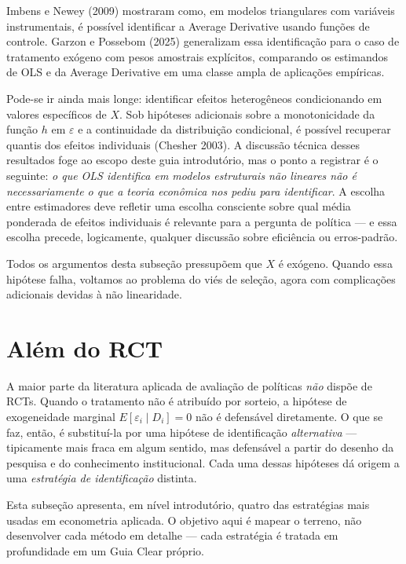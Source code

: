 Imbens e Newey (2009) mostraram como, em modelos triangulares com variáveis instrumentais, é possível identificar a Average Derivative usando funções de controle. Garzon e Possebom (2025) generalizam essa identificação para o caso de tratamento exógeno com pesos amostrais explícitos, comparando os estimandos de OLS e da Average Derivative em uma classe ampla de aplicações empíricas.

Pode-se ir ainda mais longe: identificar efeitos heterogêneos condicionando em valores específicos de $X$. Sob hipóteses adicionais sobre a monotonicidade da função $h$ em $\varepsilon$ e a continuidade da distribuição condicional, é possível recuperar quantis dos efeitos individuais (Chesher 2003). A discussão técnica desses resultados foge ao escopo deste guia introdutório, mas o ponto a registrar é o seguinte: \textit{o que OLS identifica em modelos estruturais não lineares não é necessariamente o que a teoria econômica nos pediu para identificar}. A escolha entre estimadores deve refletir uma escolha consciente sobre qual média ponderada de efeitos individuais é relevante para a pergunta de política --- e essa escolha precede, logicamente, qualquer discussão sobre eficiência ou erros-padrão.

Todos os argumentos desta subseção pressupõem que $X$ é exógeno. Quando essa hipótese falha, voltamos ao problema do viés de seleção, agora com complicações adicionais devidas à não linearidade.

\section{Além do RCT}
\label{subsec:alem-rct}

A maior parte da literatura aplicada de avaliação de políticas \textit{não} dispõe de RCTs. Quando o tratamento não é atribuído por sorteio, a hipótese de exogeneidade marginal $E[\varepsilon_i \mid D_i] = 0$ não é defensável diretamente. O que se faz, então, é substituí-la por uma hipótese de identificação \textit{alternativa} --- tipicamente mais fraca em algum sentido, mas defensável a partir do desenho da pesquisa e do conhecimento institucional. Cada uma dessas hipóteses dá origem a uma \textit{estratégia de identificação} distinta.

Esta subseção apresenta, em nível introdutório, quatro das estratégias mais usadas em econometria aplicada. O objetivo aqui é mapear o terreno, não desenvolver cada método em detalhe --- cada estratégia é tratada em profundidade em um Guia Clear próprio.


